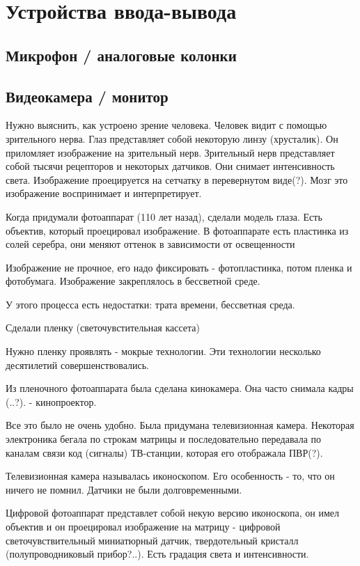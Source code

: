 \section{Устройства ввода-вывода}

\subsection*{Микрофон / аналоговые колонки}

\subsection*{Видеокамера / монитор}

Нужно выяснить, как устроено зрение человека. Человек видит с помощью зрительного нерва. Глаз представляет собой некоторую линзу (хрусталик). Он приломляет изображение на зрительный нерв. Зрительный нерв представляет собой тысячи рецепторов и некоторых датчиков. Они снимает интенсивность света. Изображение проецируется на сетчатку в перевернутом виде(?). Мозг это изображение воспринимает и интерпретирует.

Когда придумали фотоаппарат (110 лет назад), сделали модель глаза. Есть объектив, который проецировал изображение. В фотоаппарате есть пластинка из солей серебра, они меняют оттенок в зависимости от освещенности

Изображение не прочное, его надо фиксировать - фотопластинка, потом пленка и фотобумага. Изображение закреплялось в бессветной среде.

У этого процесса есть недостатки: трата времени, бессветная среда.

Сделали пленку (светочувстительная кассета)

Нужно пленку проявлять - мокрые технологии. Эти технологии несколько десятилетий совершенствовались.

Из пленочного фотоаппарата была сделана кинокамера. Она часто снимала кадры (..?). - кинопроектор.


Все это было не очень удобно. Была придумана телевизионная камера. Некоторая электроника бегала по строкам матрицы и последовательно передавала по каналам связи код (сигналы) ТВ-станции, которая его отображала ПВР(?).

Телевизионная камера называлась иконоскопом. Его особенность - то, что он ничего не помнил. Датчики не были долговременными.

Цифровой фотоаппарат представлет собой некую версию иконоскопа, он имел объектив и он проецировал изображение на матрицу - цифровой светочувствительный миниатюрный датчик, твердотельный кристалл (полупроводниковый прибор?..). Есть градация света и интенсивности.

